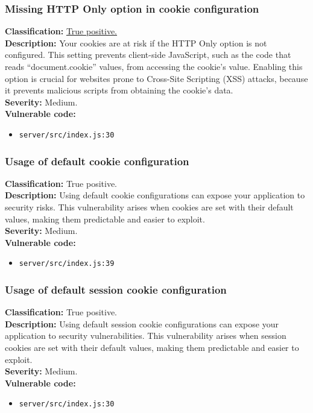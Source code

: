 \documentclass[]{article}
\begin{document}
\subsubsection{Missing HTTP Only option in cookie configuration}
\textbf{Classification:} \hyperref[subsubsec:sensitive_cookie_without_secure_and_httponly_attributes]{True positive.} \\
\textbf{Description:} Your cookies are at risk if the HTTP Only option is not configured. This setting prevents client-side JavaScript, such as the code that reads ``document.cookie'' values, from accessing the cookie's value. Enabling this option is crucial for websites prone to Cross-Site Scripting (XSS) attacks, because it prevents malicious scripts from obtaining the cookie's data. \\ 
\textbf{Severity:} Medium. \\ 
\textbf{Vulnerable code:}
\begin{itemize}
    \item \texttt{server/src/index.js:30}
\end{itemize}

\subsubsection{Usage of default cookie configuration}
\textbf{Classification:} True positive. \\
\textbf{Description:} Using default cookie configurations can expose your application to security risks. This vulnerability arises when cookies are set with their default values, making them predictable and easier to exploit. \\ 
\textbf{Severity:} Medium. \\ 
\textbf{Vulnerable code:}
\begin{itemize}
    \item \texttt{server/src/index.js:39}
\end{itemize}

\subsubsection{Usage of default session cookie configuration}
\textbf{Classification:} True positive. \\
\textbf{Description:} Using default session cookie configurations can expose your application to security vulnerabilities. This vulnerability arises when session cookies are set with their default values, making them predictable and easier to exploit. \\ 
\textbf{Severity:} Medium. \\ 
\textbf{Vulnerable code:}
\begin{itemize}
    \item \texttt{server/src/index.js:30}
\end{itemize}
\end{document}
